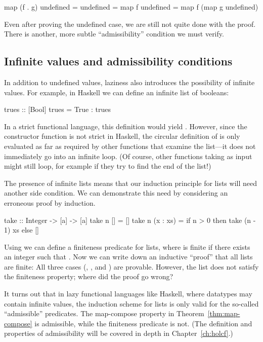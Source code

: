 \begin{hscode}
map (f . g) undefined
  = undefined
  = map f undefined
  = map f (map g undefined)
\end{hscode}

Even after proving the undefined case, we are still not quite done with the proof. There is another, more subtle ``admissibility'' condition we must verify.

\subsection{Infinite values and admissibility conditions}

In addition to undefined values, laziness also introduces the possibility of infinite values. For example, in Haskell we can define an infinite list of booleans:
%
\begin{hscode}
trues :: [Bool]
trues = True : trues
\end{hscode}
%
In a strict functional language, this definition would yield . However, since the constructor function \hs{(:)} is not strict in Haskell, the circular definition of  is only evaluated as far as required by other functions that examine the list---it does not immediately go into an infinite loop. (Of course, other functions taking  as input might still loop, for example if they try to find the end of the list!)

The presence of infinite lists means that our induction principle for lists will need another side condition. We can demonstrate this need by considering an erroneous proof by induction.
%
\begin{hscode}
take :: Integer -> [a] -> [a]
take n []       = []
take n (x : xs) = if n > 0 then take (n - 1) xs else []
\end{hscode}
%
Using  we can define a finiteness predicate for lists, where  is finite if there exists an integer  such that . Now we can write down an inductive ``proof'' that all lists are finite: All three cases (, \hs{[]}, and ) are provable. However, the list  does not satisfy the finiteness property; where did the proof go wrong?

It turns out that in lazy functional languages like Haskell, where datatypes may contain infinite values, the induction scheme for lists is only valid for the so-called ``admissible'' predicates. The map-compose property in Theorem~\ref{thm:map-compose} is admissible, while the finiteness predicate is not. (The definition and properties of admissibility will be covered in depth in Chapter~\ref{ch:holcf}.)

